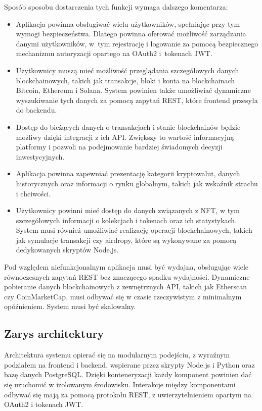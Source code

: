 Sposób sposobu dostarczenia tych funkcji wymaga dalszego komentarza:
\begin{itemize}
\item Aplikacja powinna obsługiwać wielu użytkowników, spełniając przy tym wymogi bezpieczeństwa. Dlatego powinna oferować możliwość zarządzania danymi użytkowników, w~tym rejestrację i logowanie za pomocą bezpiecznego mechanizmu autoryzacji opartego na OAuth2 i~tokenach JWT. 
\item Użytkownicy muszą mieć możliwość przeglądania szczegółowych danych blockchainowych, takich jak transakcje, bloki i konta na blockchainach Bitcoin, Ethereum i Solana. System powinien także umożliwiać dynamiczne wyszukiwanie tych danych za pomocą zapytań REST, które frontend przesyła do backendu.
\item Dostęp do bieżących danych o transakcjach i stanie blockchainów będzie możliwy dzięki integracji z ich API. Zwiększy to wartość informacyjną platformy i pozwoli na podejmowanie bardziej świadomych decyzji inwestycyjnych.
\item Aplikacja powinna zapewniać prezentację kategorii kryptowalut, danych historycznych oraz informacji o rynku globalnym, takich jak wskaźnik strachu i chciwości. 
\item Użytkownicy powinni mieć dostęp do danych związanych z NFT, w tym szczegółowych informacji o kolekcjach i tokenach oraz ich statystykach. System musi również umożliwiać realizację operacji blockchainowych, takich jak symulacje transakcji czy airdropy, które są wykonywane za pomocą dedykowanych skryptów Node.js.
\end{itemize}

Pod względem niefunkcjonalnym aplikacja musi być wydajna, obsługując wiele równoczesnych zapytań REST bez znaczącego spadku wydajności. Dynamiczne pobieranie danych blockchainowych z zewnętrznych API, takich jak Etherscan czy CoinMarketCap, musi odbywać się w czasie rzeczywistym z minimalnym opóźnieniem. System musi być skalowalny.

\subsection{Zarys architektury}\label{subsec:ZarysArchitektury}
Architektura systemu opierać się na modularnym podejściu, z wyraźnym podziałem na frontend i backend, wspierane przez skrypty Node.js i Python oraz bazę danych PostgreSQL. Dzięki konteneryzacji każdy komponent powinien dać się uruchomić w izolowanym środowisku. Interakcje między komponentami odbywać się mają za pomocą protokołu REST, z uwierzytelnieniem opartym na OAuth2 i tokenach JWT.

